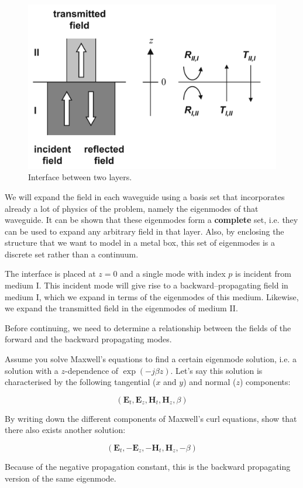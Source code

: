 \begin{figure}[ht]
\centering
\includegraphics{numeric/figures/interface}
\caption{Interface between two layers.}
\label{fig-interface}
\end{figure}

We will expand the field in each waveguide using a basis set that incorporates already a lot of physics of the problem, namely the eigenmodes of that waveguide. It can be shown that these eigenmodes form a \textbf{complete} set, i.e. they can be used to expand any arbitrary field in that layer. Also, by enclosing the structure that we want to model in a metal box, this set of eigenmodes is a discrete set rather than a continuum.

The interface is placed at $z=0$ and a single mode with index $p$ is incident from medium I. This incident mode will give rise to a backward--propagating field in medium I, which we expand in terms of the eigenmodes of this medium. Likewise, we expand the transmitted field in the eigenmodes of medium II.

Before continuing, we need to determine a relationship between the fields of the forward and the backward propagating modes.

\begin{exer}
Assume you solve Maxwell's equations to find a certain eigenmode solution, i.e. a solution with a $z$-dependence of $\exp{(-j \beta z)}$. Let's say this solution is characterised by the following tangential ($x$ and $y$) and normal ($z$) components:

$$\left( \mathbf{E}_{t},\mathbf{E}_{z},\mathbf{H}_{t},\mathbf{H}_{z},\beta \right)$$

By writing down the different components of Maxwell's curl equations, show that there also exists another solution:

$$  \left( \mathbf{E}_{t},-\mathbf{E}_{z},-\mathbf{H}_{t},\mathbf{H}_{z},-\beta \right) $$

Because of the negative propagation constant, this is the backward propagating version of the same eigenmode.

\end{exer}

